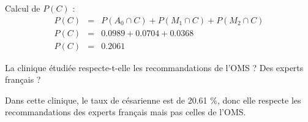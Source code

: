\begin{questions}
\begin{solution}
	Calcul de $P(C)$ :
	\begin{eqnarray*}
		P(C) &=& P(A_0 \cap C) + P(M_1 \cap C) + P(M_2 \cap C) \\
		P(C) &=& \num{0.0989} + \num{0.0704} + \num{0.0368} \\
		P(C) &=& 0.2061				
	\end{eqnarray*}
	\end{solution}
	
	\question[1] La clinique étudiée respecte-t-elle les recommandations de l'OMS ? Des experts français ?
	\begin{solution}
		Dans cette clinique, le taux de césarienne est de \num{20.61} \%, donc elle respecte les recommandations des experts français mais pas celles de l'OMS. 
	\end{solution}
		
\end{questions}